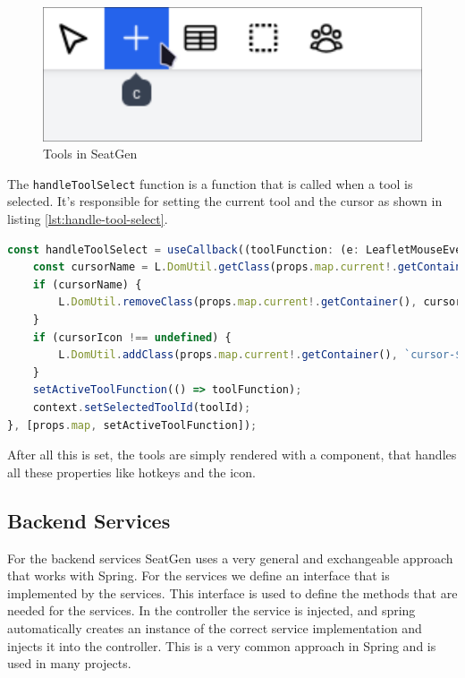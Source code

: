 \begin{figure}
    \centering
    \includegraphics[scale=0.2]{pics/toolbar.png}
    \caption{Tools in SeatGen}
    \label{fig:tools}
\end{figure}


The \texttt{handleToolSelect} function is a function that is called when a tool is selected. It's responsible for setting the current tool and the cursor as shown in listing \ref{lst:handle-tool-select}.

\begin{lstlisting}[language=TypeScript,caption={Handle tool select function},label={lst:handle-tool-select}]
const handleToolSelect = useCallback((toolFunction: (e: LeafletMouseEvent) => void, toolId: string, cursorIcon?: string) => {
    const cursorName = L.DomUtil.getClass(props.map.current!.getContainer()).split(" ").find((it) => it.startsWith("cursor-"));
    if (cursorName) {
        L.DomUtil.removeClass(props.map.current!.getContainer(), cursorName);
    }
    if (cursorIcon !== undefined) {
        L.DomUtil.addClass(props.map.current!.getContainer(), `cursor-${cursorIcon}`);
    }
    setActiveToolFunction(() => toolFunction);
    context.setSelectedToolId(toolId);
}, [props.map, setActiveToolFunction]);
\end{lstlisting}

After all this is set, the tools are simply rendered with a component, that handles all these properties like hotkeys and the icon.

\subsection{Backend Services}
For the backend services SeatGen uses a very general and exchangeable approach that works with Spring. For the services we define an interface that is implemented by the services. This interface is used to define the methods that are needed for the services. In the controller the service is injected, and spring automatically creates an instance of the correct service implementation and injects it into the controller. This is a very common approach in Spring and is used in many projects.